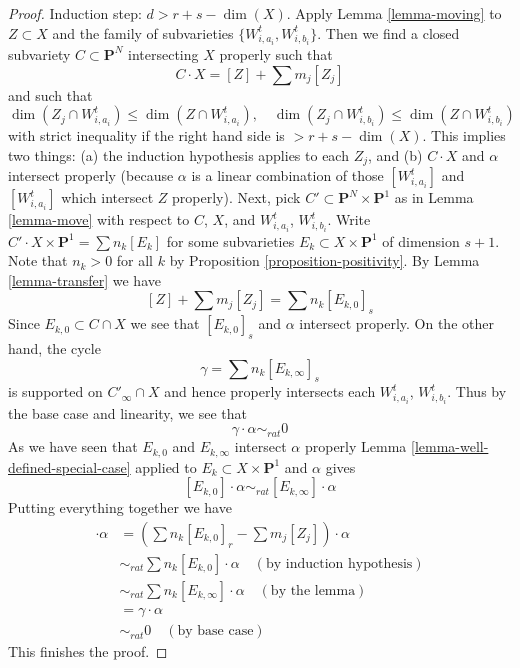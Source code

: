 \begin{proof}
\medskip\noindent
Induction step: $d >  r + s - \dim(X)$. Apply
Lemma \ref{lemma-moving} to $Z \subset X$ and
the family of subvarieties $\{W_{i, a_i}^t, W_{i, b_i}^t\}$. Then we find a
closed subvariety $C \subset \mathbf{P}^N$ intersecting $X$
properly such that
$$
C \cdot X = [Z] + \sum m_j [Z_j]
$$
and such that
$$
\dim(Z_j \cap W_{i, a_i}^t) \leq \dim(Z \cap W_{i, a_i}^t),\quad
\dim(Z_j \cap W_{i, b_i}^t) \leq \dim(Z \cap W_{i, b_i}^t)
$$
with strict inequality if the right hand side is $> r + s - \dim(X)$.
This implies two things: (a) the induction hypothesis applies to
each $Z_j$, and (b) $C \cdot X$ and $\alpha$ intersect properly (because
$\alpha$ is a linear combination of those $[W_{i, a_i}^t]$ and
$[W_{i, a_i}^t]$ which intersect $Z$ properly).
Next, pick $C' \subset \mathbf{P}^N \times \mathbf{P}^1$
as in Lemma \ref{lemma-move} with respect to $C$, $X$, and
$W_{i, a_i}^t$, $W_{i, b_i}^t$.
Write $C' \cdot X \times \mathbf{P}^1 = \sum n_k [E_k]$ for
some subvarieties $E_k \subset X \times \mathbf{P}^1$ of
dimension $s + 1$. Note that $n_k > 0$ for all $k$ by
Proposition \ref{proposition-positivity}.
By Lemma \ref{lemma-transfer} we have
$$
[Z] + \sum m_j [Z_j] = \sum n_k[E_{k, 0}]_s
$$
Since $E_{k, 0} \subset C \cap X$ we see that $[E_{k, 0}]_s$ and $\alpha$
intersect properly. On the other hand, the cycle
$$
\gamma = \sum n_k[E_{k, \infty}]_s
$$
is supported on $C'_\infty \cap X$ and hence
properly intersects each $W_{i, a_i}^t$, $W_{i, b_i}^t$.
Thus by the base case and linearity, we see that
$$
\gamma \cdot \alpha \sim_{rat} 0
$$
As we have seen that $E_{k, 0}$ and $E_{k, \infty}$
intersect $\alpha$ properly Lemma \ref{lemma-well-defined-special-case}
applied to $E_k \subset X \times \mathbf{P}^1$ and $\alpha$ gives
$$
[E_{k, 0}] \cdot \alpha \sim_{rat} [E_{k, \infty}] \cdot \alpha
$$
Putting everything together we have
\begin{align*}
[Z] \cdot \alpha
& =
(\sum n_k[E_{k, 0}]_r - \sum m_j[Z_j]) \cdot \alpha \\
& \sim_{rat}
\sum n_k [E_{k, 0}] \cdot \alpha \quad (\text{by induction hypothesis})\\
& \sim_{rat}
\sum n_k [E_{k, \infty}] \cdot \alpha \quad (\text{by the lemma})\\
& =
\gamma \cdot \alpha \\
& \sim_{rat}
0 \quad (\text{by base case})
\end{align*}
This finishes the proof.
\end{proof}

